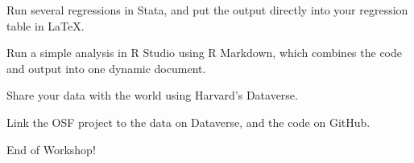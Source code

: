 \documentclass[addpoints,10pt]{exam}
\begin{document}
\begin{questions}

\question
Run several regressions in Stata, and put the output directly into your regression table in LaTeX.

\question
Run a simple analysis in R Studio using R Markdown, which combines the code and output into one dynamic document.

\question
Share your data with the world using Harvard's Dataverse.

\question
Link the OSF project to the data on Dataverse, and the code on GitHub.
\begin{center}
End of Workshop!
\end{center}
\end{questions}
\end{document}
